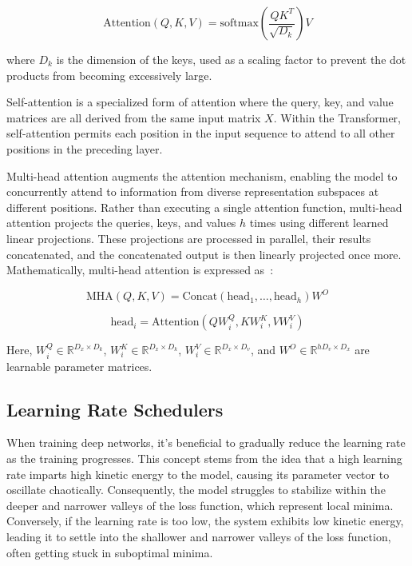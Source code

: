 \documentclass[12pt,a4paper]{report}
\begin{document}
\begin{equation}
  \text{Attention}(Q, K, V) = \text{softmax}\left(\frac{QK^T}{\sqrt{D_k}}\right) V
\end{equation}

where \( D_k \) is the dimension of the keys, used as a scaling factor to prevent the dot products from becoming excessively large.

Self-attention is a specialized form of attention where the query, key, and value matrices are all derived from the same input matrix \( X \). Within the Transformer, self-attention permits each position in the input sequence to attend to all other positions in the preceding layer.

Multi-head attention augments the attention mechanism, enabling the model to concurrently attend to information from diverse representation subspaces at different positions. Rather than executing a single attention function, multi-head attention projects the queries, keys, and values \( h \) times using different learned linear projections. These projections are processed in parallel, their results concatenated, and the concatenated output is then linearly projected once more. Mathematically, multi-head attention is expressed as~\cite{Comajoan_Cara_2024}:

\begin{equation}
  \text{MHA}(Q, K, V) = \text{Concat}(\text{head}_1, \ldots, \text{head}_h) W^O
\end{equation}

\begin{equation}
  \text{head}_i = \text{Attention}(Q W_i^Q, K W_i^K, V W_i^V)
\end{equation}

Here, \( W_i^Q \in \mathbb{R}^{D_x \times D_k} \), \( W_i^K \in \mathbb{R}^{D_x \times D_k} \), \( W_i^V \in \mathbb{R}^{D_x \times D_v} \), and \( W^O \in \mathbb{R}^{h D_v \times D_x} \) are learnable parameter matrices.


\subsection{Learning Rate Schedulers}
When training deep networks, it's beneficial to gradually reduce the learning rate as the training progresses. This concept stems from the idea that a high learning rate imparts high kinetic energy to the model, causing its parameter vector to oscillate chaotically. Consequently, the model struggles to stabilize within the deeper and narrower valleys of the loss function, which represent local minima. Conversely, if the learning rate is too low, the system exhibits low kinetic energy, leading it to settle into the shallower and narrower valleys of the loss function, often getting stuck in suboptimal minima.
\end{document}
